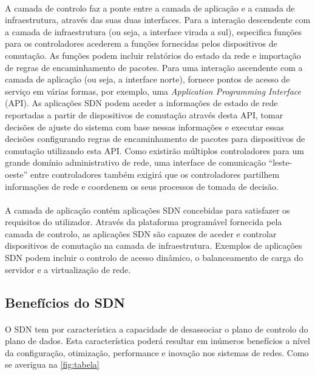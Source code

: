 \documentclass{llncs}
\begin{document}
\paragraph{}
A camada de controlo faz a ponte entre a camada de aplicação e a camada de infraestrutura, através das suas duas interfaces. Para a interação descendente com a camada de infraestrutura (ou seja, a interface virada a sul), especifica funções para os controladores acederem a funções fornecidas pelos dispositivos de comutação. As funções podem incluir relatórios do estado da rede e importação de regras de encaminhamento de pacotes. Para uma interação ascendente com a camada de aplicação (ou seja, a interface norte), fornece pontos de acesso de serviço em várias formas, por exemplo, uma \textit{Application Programming Interface} (API). As aplicações SDN podem aceder a informações de estado de rede reportadas a partir de dispositivos de comutação através desta API, tomar decisões de ajuste do sistema com base nessas informações e executar essas decisões configurando regras de encaminhamento de pacotes para dispositivos de comutação utilizando esta API. Como existirão múltiplos controladores para um grande domínio administrativo de rede, uma interface de comunicação “leste-oeste” entre controladores também exigirá que os controladores partilhem informações de rede e coordenem os seus processos de tomada de decisão.
\paragraph{}
A camada de aplicação contém aplicações SDN concebidas para satisfazer os requisitos do utilizador. Através da plataforma programável fornecida pela camada de controlo, as aplicações SDN são capazes de aceder e controlar dispositivos de comutação na camada de infraestrutura. Exemplos de aplicações SDN podem incluir o controlo de acesso dinâmico, o balanceamento de carga do servidor e a virtualização de rede.

\subsection{Benefícios do SDN}
\paragraph{}
O SDN tem por característica a capacidade de desassociar o plano de controlo do plano de dados. Esta característica poderá resultar em inúmeros benefícios a nível da 
configuração, otimização, performance e inovação nos sistemas de redes. Como se averigua na \ref{fig:tabela}
\end{document}
